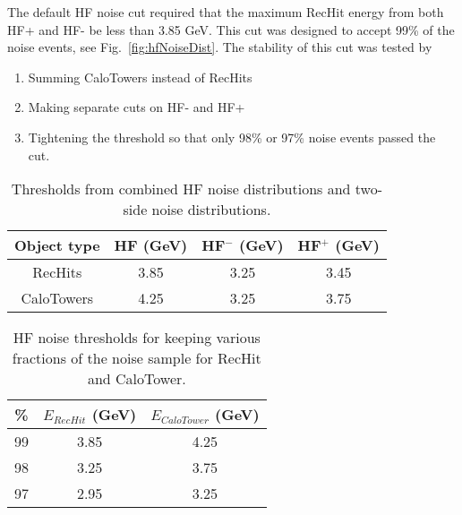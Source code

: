     The default HF noise cut required that the maximum RecHit energy
      from both HF+ and HF- be less than 3.85 GeV. 
    This cut was designed to accept 99\% of the noise events, 
      see Fig.~\ref{fig:hfNoiseDist}. 
    The stability of this cut was tested by
    \begin{enumerate}
      \item Summing CaloTowers instead of RecHits
      \item Making separate cuts on HF- and HF+
      \item Tightening the threshold so that only 98\% or 97\% noise events 
        passed the cut.
    \end{enumerate}
    \begin{table}[!Hhbt]
      \centering
      \begin{tabular}{|c|c|c|c|}
        \hline
        Object type & HF (GeV) & HF$^{-}$ (GeV) & HF$^{+}$ (GeV) \\ \hline
        RecHits & 3.85 & 3.25 & 3.45 \\ \hline
        CaloTowers & 4.25 & 3.25 & 3.75 \\ \hline
      \end{tabular}
      \caption{Thresholds from combined HF noise distributions and 
        two-side noise distributions.}
      \label{tab:hfNoiseThreshAsym}
    \end{table}

    \begin{table}[!Hhbt]
      \centering
        \begin{tabular}{|c|c|c|} \hline
          \% &  $E_{RecHit}$ (GeV) & $E_{CaloTower}$ (GeV)\\ 
          \hline
          99 & 3.85& 4.25 \\ \hline
          98 & 3.25& 3.75 \\ \hline
          97 & 2.95& 3.25 \\  \hline
         \end{tabular}
        \caption{HF noise thresholds for keeping various fractions of the noise
          sample for RecHit and CaloTower.}
        \label{tab:hfAdjustedThresholds}
    \end{table}

